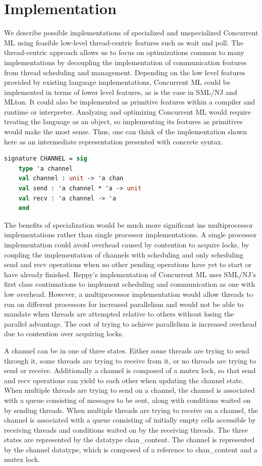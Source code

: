 \documentclass{article}
\begin{document}
\section{Implementation}
We describe possible implementations of specialized and unspecialized Concurrent ML using
feasible low-level thread-centric features such as wait and poll.  The thread-centric approach
allows us to focus on optimizations common to many implementations by decoupling the
implementation of communication features from thread scheduling and management.  Depending on
the low level features provided by existing language implementations, Concurrent ML could be
implemented in terms of lower level features, as is the case in SML/NJ and MLton.  It could
also be implemented as primitive features within a compiler and runtime or interpreter.
Analyzing and optimizing Concurrent ML would require treating the language as an object, so
implementing its features as primitives would make the most sense.  Thus, one can think of the
implementation shown here as an intermediate representation presented with concrete syntax.

\begin{lstlisting}[language=ML, escapechar=\%]
  signature CHANNEL = sig
    type 'a channel 
    val channel : unit -> 'a chan
    val send : 'a channel * 'a -> unit
    val recv : 'a channel -> 'a
    end     
\end{lstlisting}


The benefits of specialization would be much more significant ins multiprocessor
implementations rather than single processor implementations.  A single processor
implementation could avoid overhead caused by contention to acquire locks, by coupling the
implementation of channels with scheduling and only scheduling send and recv operations when no
other pending operations have yet to start or have already finished.  Reppy's implementation of
Concurrent ML uses SML/NJ's first class continuations to implement scheduling and communication
as one with low overhead.  However, a multiprocessor implementation would allow threads to run
on different processors for increased parallelism and would not be able to mandate when threads
are attempted relative to others without losing the parallel advantage.  The cost of trying to
achieve parallelism is increased overhead due to contention over acquiring locks.

A channel can be in one of three states.  Either some threads are trying to send through it,
some threads are trying to receive from it, or no threads are trying to send or receive.
Additionally a channel is composed of a mutex lock, so that send and recv operations can yield
to each other when updating the channel state.  When multiple threads are trying to send on a
channel, the channel is associated with a queue consisting of messages to be sent, along with
conditions waited on by sending threads. When multiple threads are trying to receive on a
channel, the channel is associated with a queue consisting of initially empty cells accessible
by receiving threads and conditions waited on by the receiving threads. The three states are
represented by the datatype chan\_content.  The channel is represented by the channel datatype,
which is composed of a reference to chan\_content and a mutex lock.  
\end{document}
